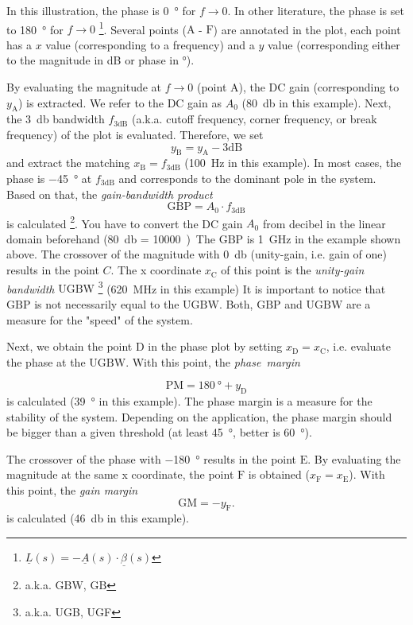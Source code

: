 \documentclass{article}[11pt]
\begin{document}
In this illustration, the phase is \SI{0}{\degree} for $f \rightarrow 0$.
In other literature, the phase is set to \SI{180}{\degree} for 
$f \rightarrow 0$%
\footnote{$\underline{L}(s) = -\underline{A}(s) \cdot \underline{\beta}(s)$}.
Several points ($\mathrm{A}$ - $\mathrm{F}$) are annotated in the plot, each 
point has a $x$ value (corresponding to a frequency) and a $y$ value 
(corresponding either to the magnitude in dB or phase in \si{\degree}).

\medskip

By evaluating the magnitude at $f \rightarrow 0$ (point $\mathrm{A}$), the
DC gain (corresponding to $y_{\mathrm{A}}$) is extracted.
We refer to the DC gain as $A_0$ (\SI{80}{\decibel} in this example).
Next, the \SI{3}{\decibel} bandwidth $f_{\mathrm{3dB}}$ 
(a.k.a. cutoff frequency, corner frequency, or break frequency) of the
plot is evaluated. 
Therefore, we set
$$
y_{\mathrm{B}} = y_{\mathrm{A}} - 3 \mathrm{dB}
$$
and extract the matching $x_{\mathrm{B}} = f_{\mathrm{3dB}}$ 
(\SI{100}{\hertz} in this example).
In most cases, the phase is \SI{-45}{\degree} at
$f_{\mathrm{3dB}}$ and corresponds to the dominant pole in the system.
Based on that, the \textit{gain-bandwidth product}
\begin{equation}
\mathrm{GBP} = A_0 \cdot f_{\mathrm{3dB}}
\end{equation}
is calculated%
\footnote{a.k.a. $\mathrm{GBW}$, $\mathrm{GB}$}. 
You have to convert the DC gain $A_0$ from decibel in the linear domain 
beforehand (\SI{80}{\decibel} = \qty{10000}).
The $\mathrm{GBP}$ is \SI{1}{\giga\hertz} in the example shown above.
The crossover of the magnitude with \SI{0}{\decibel} 
(unity-gain, i.e. gain of one) results in the point $C$.
The x coordinate $x_{\mathrm{C}}$ of this point is the 
\textit{unity-gain bandwidth}
$\mathrm{UGBW}$%
\footnote{a.k.a. UGB, UGF}
(\SI{620}{\mega\hertz} in this example)
It is important to notice that $\mathrm{GBP}$ is not necessarily
equal to the $\mathrm{UGBW}$.
Both, $\mathrm{GBP}$ and $\mathrm{UGBW}$ are a measure for the "speed" of
the system.

\medskip

Next, we obtain the point $\mathrm{D}$ in the phase plot by setting 
$x_{\mathrm{D}} = x_{\mathrm{C}}$, i.e. evaluate the phase at the 
$\mathrm{UGBW}$.
With this point, the \textit{phase~margin}

$$
\mathrm{PM} = \SI{180}{\degree} + y_{\mathrm{D}}
$$
is calculated (\SI{39}{\degree} in this example).
The phase margin is a measure for the stability of the system.
Depending on the application, the phase margin should be bigger than a 
given threshold (at least \SI{45}{\degree}, better is \SI{60}{\degree}).

The crossover of the phase with \SI{-180}{\degree} results in the 
point $\mathrm{E}$.
By evaluating the magnitude at the same x coordinate, the point 
$\mathrm{F}$ is obtained ($x_{\mathrm{F}} = x_{\mathrm{E}}$).
With this point, the \textit{gain margin}
$$
\mathrm{GM} = - y_{\mathrm{F}}.
$$
is calculated (\SI{46}{\decibel} in this example).

\printbibliography
\end{document}
